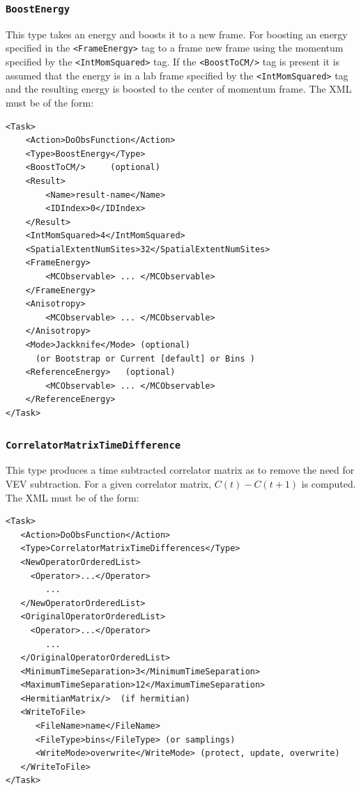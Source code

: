 \documentclass[12pt]{article}
\newcommand{\vb}{\texttt}
\begin{document}
\subsubsection{\vb{BoostEnergy}}
This type takes an energy and boosts it to a new frame.
For boosting an energy specified in the \vb{<FrameEnergy>} tag
to a frame new frame using the momentum specified by the
\vb{<IntMomSquared>} tag. If the \vb{<BoostToCM/>} tag is present
it is assumed that the energy is in a lab frame specified by the
\vb{<IntMomSquared>} tag and the resulting energy is boosted to the
center of momentum frame.
The XML must be of the form:
\begin{verbatim}
<Task>
    <Action>DoObsFunction</Action>
    <Type>BoostEnergy</Type>
    <BoostToCM/>     (optional)
    <Result>
        <Name>result-name</Name>
        <IDIndex>0</IDIndex>
    </Result>
    <IntMomSquared>4</IntMomSquared>
    <SpatialExtentNumSites>32</SpatialExtentNumSites>
    <FrameEnergy>
        <MCObservable> ... </MCObservable>
    </FrameEnergy>
    <Anisotropy>
        <MCObservable> ... </MCObservable>
    </Anisotropy>
    <Mode>Jackknife</Mode> (optional)
      (or Bootstrap or Current [default] or Bins )
    <ReferenceEnergy>   (optional)
        <MCObservable> ... </MCObservable>
    </ReferenceEnergy>
</Task>
\end{verbatim}
\subsubsection{\vb{CorrelatorMatrixTimeDifference}}
This type produces a time subtracted
correlator matrix as to remove the need for VEV subtraction. For a given correlator
matrix, $C(t)-C(t+1)$ is computed.
The XML must be of the form:
\begin{verbatim}
<Task>
   <Action>DoObsFunction</Action>
   <Type>CorrelatorMatrixTimeDifferences</Type>
   <NewOperatorOrderedList>
     <Operator>...</Operator>
        ...
   </NewOperatorOrderedList>
   <OriginalOperatorOrderedList>
     <Operator>...</Operator>
        ...
   </OriginalOperatorOrderedList>
   <MinimumTimeSeparation>3</MinimumTimeSeparation>
   <MaximumTimeSeparation>12</MaximumTimeSeparation>
   <HermitianMatrix/>  (if hermitian)
   <WriteToFile>
      <FileName>name</FileName>
      <FileType>bins</FileType> (or samplings)
      <WriteMode>overwrite</WriteMode> (protect, update, overwrite)
   </WriteToFile>
</Task>
\end{verbatim}
\end{document}
